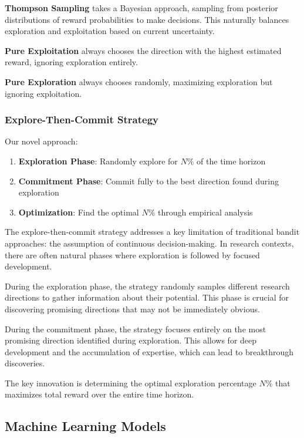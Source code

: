 \documentclass[letterpaper]{article}
\begin{document}
\textbf{Thompson Sampling} takes a Bayesian approach, sampling from posterior distributions of reward probabilities to make decisions. This naturally balances exploration and exploitation based on current uncertainty.

\textbf{Pure Exploitation} always chooses the direction with the highest estimated reward, ignoring exploration entirely.

\textbf{Pure Exploration} always chooses randomly, maximizing exploration but ignoring exploitation.

\subsubsection{Explore-Then-Commit Strategy}

Our novel approach:
\begin{enumerate}
\item \textbf{Exploration Phase}: Randomly explore for $N\%$ of the time horizon
\item \textbf{Commitment Phase}: Commit fully to the best direction found during exploration
\item \textbf{Optimization}: Find the optimal $N\%$ through empirical analysis
\end{enumerate}

The explore-then-commit strategy addresses a key limitation of traditional bandit approaches: the assumption of continuous decision-making. In research contexts, there are often natural phases where exploration is followed by focused development.

During the exploration phase, the strategy randomly samples different research directions to gather information about their potential. This phase is crucial for discovering promising directions that may not be immediately obvious.

During the commitment phase, the strategy focuses entirely on the most promising direction identified during exploration. This allows for deep development and the accumulation of expertise, which can lead to breakthrough discoveries.

The key innovation is determining the optimal exploration percentage $N\%$ that maximizes total reward over the entire time horizon.

\subsection{Machine Learning Models}
\end{document}
